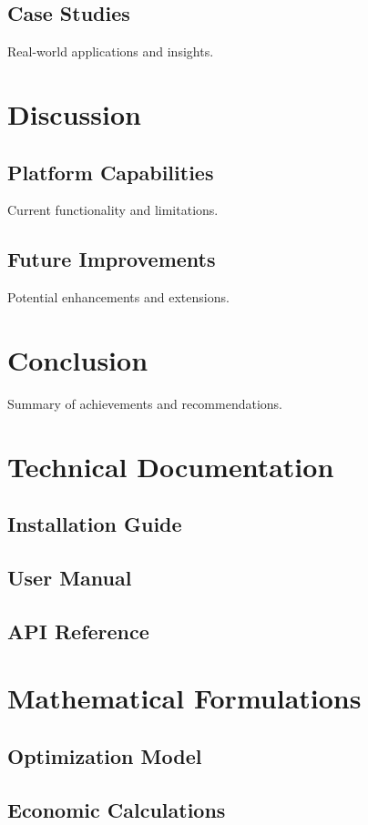 \documentclass{article}
\begin{document}
\subsection{Case Studies}
Real-world applications and insights.

\section{Discussion}
\subsection{Platform Capabilities}
Current functionality and limitations.

\subsection{Future Improvements}
Potential enhancements and extensions.

\section{Conclusion}
Summary of achievements and recommendations.

\appendix
\section{Technical Documentation}
\subsection{Installation Guide}
\subsection{User Manual}
\subsection{API Reference}

\section{Mathematical Formulations}
\subsection{Optimization Model}
\subsection{Economic Calculations}



\end{document}
